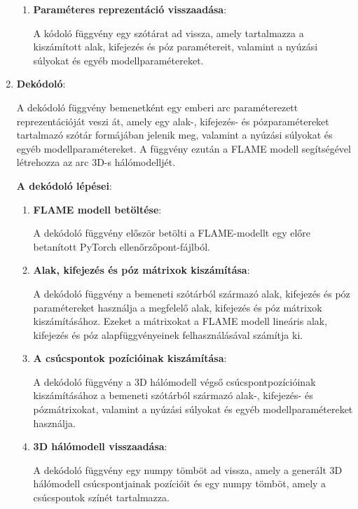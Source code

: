 \documentclass[12pt,a4]{article}
\begin{document}
\begin{enumerate}
\begin{enumerate}
            \item \textbf{Paraméteres reprezentáció visszaadása}:

            A kódoló függvény egy szótárat ad vissza, amely tartalmazza a kiszámított alak, kifejezés és póz paramétereit, valamint a nyúzási súlyokat és egyéb modellparamétereket.

        \end{enumerate}
        

        
        \item \textbf{Dekódoló}:

        A dekódoló függvény bemenetként egy emberi arc paraméterezett reprezentációját veszi át, amely egy alak-, kifejezés- és pózparamétereket tartalmazó szótár formájában jelenik meg, 
valamint a nyúzási súlyokat és egyéb modellparamétereket. A függvény ezután a FLAME modell segítségével létrehozza az arc 3D-s hálómodelljét.

        \textbf{A dekódoló lépései}:
        
        \begin{enumerate}
            \item \textbf{FLAME modell betöltése}:
            
            A dekódoló függvény először betölti a FLAME-modellt egy előre betanított PyTorch ellenőrzőpont-fájlból.

            \item \textbf{Alak, kifejezés és póz mátrixok kiszámítása}:
            
            A dekódoló függvény a bemeneti szótárból származó alak, kifejezés és póz paramétereket használja a megfelelő alak, kifejezés és póz mátrixok kiszámításához. 
Ezeket a mátrixokat a FLAME modell lineáris alak, kifejezés és póz alapfüggvényeinek felhasználásával számítja ki.

            \item \textbf{A csúcspontok pozícióinak kiszámítása}:
            
A dekódoló függvény a 3D hálómodell végső csúcspontpozícióinak kiszámításához a bemeneti szótárból származó alak-, kifejezés- és pózmátrixokat, valamint a nyúzási súlyokat és egyéb modellparamétereket használja.

            \item \textbf{3D hálómodell visszaadása}:
            
            A dekódoló függvény egy numpy tömböt ad vissza, amely a generált 3D hálómodell csúcspontjainak pozícióit és egy numpy tömböt, amely a csúcspontok színét tartalmazza.


\end{enumerate}
\end{enumerate}
\end{document}

